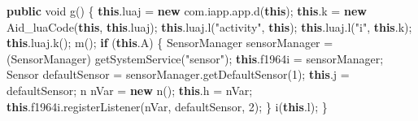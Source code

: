 \documentclass[
]{article}
\newenvironment{Shaded}{}{}
\newcommand{\ControlFlowTok}[1]{\textcolor[rgb]{0.00,0.44,0.13}{\textbf{#1}}}
\newcommand{\DataTypeTok}[1]{\textcolor[rgb]{0.56,0.13,0.00}{#1}}
\newcommand{\DecValTok}[1]{\textcolor[rgb]{0.25,0.63,0.44}{#1}}
\newcommand{\FunctionTok}[1]{\textcolor[rgb]{0.02,0.16,0.49}{#1}}
\newcommand{\KeywordTok}[1]{\textcolor[rgb]{0.00,0.44,0.13}{\textbf{#1}}}
\newcommand{\NormalTok}[1]{#1}
\newcommand{\OperatorTok}[1]{\textcolor[rgb]{0.40,0.40,0.40}{#1}}
\newcommand{\StringTok}[1]{\textcolor[rgb]{0.25,0.44,0.63}{#1}}
\begin{document}
\begin{Shaded}
\begin{Highlighting}[]
    \KeywordTok{public} \DataTypeTok{void} \FunctionTok{g}\OperatorTok{()} \OperatorTok{\{}
        \KeywordTok{this}\OperatorTok{.}\FunctionTok{luaj} \OperatorTok{=} \KeywordTok{new}\NormalTok{ com}\OperatorTok{.}\FunctionTok{iapp}\OperatorTok{.}\FunctionTok{app}\OperatorTok{.}\FunctionTok{d}\OperatorTok{(}\KeywordTok{this}\OperatorTok{);}
        \KeywordTok{this}\OperatorTok{.}\FunctionTok{k} \OperatorTok{=} \KeywordTok{new} \FunctionTok{Aid\_luaCode}\OperatorTok{(}\KeywordTok{this}\OperatorTok{,} \KeywordTok{this}\OperatorTok{.}\FunctionTok{luaj}\OperatorTok{);}
        \KeywordTok{this}\OperatorTok{.}\FunctionTok{luaj}\OperatorTok{.}\FunctionTok{l}\OperatorTok{(}\StringTok{"activity"}\OperatorTok{,} \KeywordTok{this}\OperatorTok{);}
        \KeywordTok{this}\OperatorTok{.}\FunctionTok{luaj}\OperatorTok{.}\FunctionTok{l}\OperatorTok{(}\StringTok{"i"}\OperatorTok{,} \KeywordTok{this}\OperatorTok{.}\FunctionTok{k}\OperatorTok{);}
        \KeywordTok{this}\OperatorTok{.}\FunctionTok{luaj}\OperatorTok{.}\FunctionTok{k}\OperatorTok{();}
        \FunctionTok{m}\OperatorTok{();}
        \ControlFlowTok{if} \OperatorTok{(}\KeywordTok{this}\OperatorTok{.}\FunctionTok{A}\OperatorTok{)} \OperatorTok{\{}
\NormalTok{            SensorManager sensorManager }\OperatorTok{=} \OperatorTok{(}\NormalTok{SensorManager}\OperatorTok{)} \FunctionTok{getSystemService}\OperatorTok{(}\StringTok{"sensor"}\OperatorTok{);}
            \KeywordTok{this}\OperatorTok{.}\FunctionTok{f1964i} \OperatorTok{=}\NormalTok{ sensorManager}\OperatorTok{;}
\NormalTok{            Sensor defaultSensor }\OperatorTok{=}\NormalTok{ sensorManager}\OperatorTok{.}\FunctionTok{getDefaultSensor}\OperatorTok{(}\DecValTok{1}\OperatorTok{);}
            \KeywordTok{this}\OperatorTok{.}\FunctionTok{j} \OperatorTok{=}\NormalTok{ defaultSensor}\OperatorTok{;}
\NormalTok{            n nVar }\OperatorTok{=} \KeywordTok{new} \FunctionTok{n}\OperatorTok{();}
            \KeywordTok{this}\OperatorTok{.}\FunctionTok{h} \OperatorTok{=}\NormalTok{ nVar}\OperatorTok{;}
            \KeywordTok{this}\OperatorTok{.}\FunctionTok{f1964i}\OperatorTok{.}\FunctionTok{registerListener}\OperatorTok{(}\NormalTok{nVar}\OperatorTok{,}\NormalTok{ defaultSensor}\OperatorTok{,} \DecValTok{2}\OperatorTok{);}
        \OperatorTok{\}}
        \FunctionTok{i}\OperatorTok{(}\KeywordTok{this}\OperatorTok{.}\FunctionTok{l}\OperatorTok{);}
    \OperatorTok{\}}


\end{Highlighting}
\end{Shaded}
\end{document}
